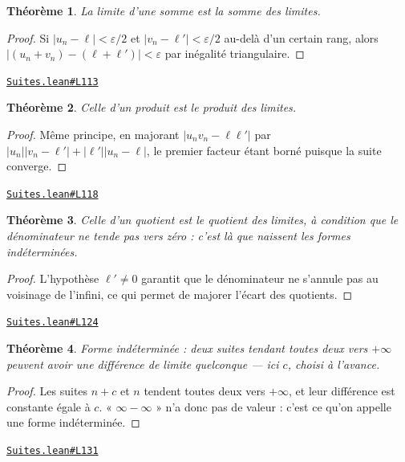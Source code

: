 \documentclass[11pt,a4paper]{article}
\theoremstyle{definition}
\theoremstyle{plain}
\newtheorem{theoreme}{Théorème}
\newcommand{\source}[2]{\par\smallskip\noindent\hfill{\footnotesize\href{#1}{\texttt{#2}}}\par\smallskip}
\begin{document}
\begin{theoreme}
La limite d'une somme est la somme des limites.
\end{theoreme}

\begin{proof}
Si $|u_n - \ell| < \varepsilon/2$ et $|v_n - \ell'| < \varepsilon/2$ au-delà d'un
certain rang, alors $|(u_n + v_n) - (\ell + \ell')| < \varepsilon$ par inégalité
triangulaire.
\end{proof}
\source{https://github.com/Commutator-IO/learn-lean/blob/main/cours/02-lycee/03-suites/Suites.lean\#L113}{Suites.lean\#L113}

\begin{theoreme}
Celle d'un produit est le produit des limites.
\end{theoreme}

\begin{proof}
Même principe, en majorant $|u_n v_n - \ell\ell'|$ par
$|u_n||v_n - \ell'| + |\ell'||u_n - \ell|$, le premier facteur étant borné puisque la
suite converge.
\end{proof}
\source{https://github.com/Commutator-IO/learn-lean/blob/main/cours/02-lycee/03-suites/Suites.lean\#L118}{Suites.lean\#L118}

\begin{theoreme}
Celle d'un quotient est le quotient des limites, à condition que le dénominateur ne
tende pas vers zéro : c'est là que naissent les formes indéterminées.
\end{theoreme}

\begin{proof}
L'hypothèse $\ell' \ne 0$ garantit que le dénominateur ne s'annule pas au voisinage de
l'infini, ce qui permet de majorer l'écart des quotients.
\end{proof}
\source{https://github.com/Commutator-IO/learn-lean/blob/main/cours/02-lycee/03-suites/Suites.lean\#L124}{Suites.lean\#L124}

\begin{theoreme}
Forme indéterminée : deux suites tendant toutes deux vers $+\infty$ peuvent avoir une
différence de limite quelconque — ici $c$, choisi à l'avance.
\end{theoreme}

\begin{proof}
Les suites $n + c$ et $n$ tendent toutes deux vers $+\infty$, et leur différence est
constante égale à $c$. « $\infty - \infty$ » n'a donc pas de valeur : c'est ce qu'on
appelle une forme indéterminée.
\end{proof}
\source{https://github.com/Commutator-IO/learn-lean/blob/main/cours/02-lycee/03-suites/Suites.lean\#L131}{Suites.lean\#L131}
\end{document}
